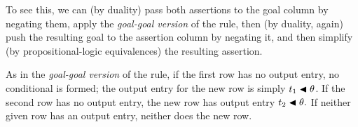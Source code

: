 \documentclass[runningheads]{llncs}
\DeclareMathOperator{\uor}{\emph{or}\,}
\DeclareMathOperator{\unot}{\emph{not}\kern-.0pt}
\begin{document}
\noindent To see this, we can (by duality) pass both assertions to the goal column by negating them, apply the \emph{goal-goal version} of the rule, then (by duality, again) push the resulting goal to the assertion column by negating it, and then simplify (by propositional-logic equivalences) the resulting assertion.

As in the \emph{goal-goal version} of the rule, if the first row has no output entry, no conditional is formed; the output entry for the new row is simply ${{t}_{1} \blacktriangleleft \theta}$.  If the second row has no output entry, the new row has output entry  ${{t}_{2} \blacktriangleleft \theta}.$  If neither given row has an output entry, neither does the new row.



\begin{comment}
    \begin{center}
\begin{tabular} {T}
\hline
    \begin{center}$\uor(\unot(\expsub{\mathcal{P}}{1}),\expsub{\mathcal{R}}{1})$\end{center} & $\qquad$ & \begin{center}$\expsub{t}{1}$\end{center} \\
    \begin{center}$\uor(\unot(\expsub{\mathcal{P}}{1}),\expsub{\mathcal{R}}{1})$ \end{center}& $\qquad$ & \begin{center}$\expsub{t}{1}$\end{center} \\
  \hline
\end{tabular}
\end{center}
\noindent and
  \begin{center}
\begin{tabular} {T}
\hline
    \begin{center}$ \uor(\expsub{\mathcal{P}}{2},\expsub{\mathcal{R}}{2})$\end{center}  &  $\qquad$  & \begin{center}$\expsub{t}{2}$\end{center} \\
  \hline
\end{tabular}
\end{center}
\noindent where the two rows are standardized apart, and $\expsub{\mathcal{P}}{1}$ and $\expsub{\mathcal{P}}{2}$ are unifiable, with the most-general unifier $\theta$; let  $ \mathcal{P} = \expsub{\mathcal{P}}{1} \apply \theta = \expsub{\mathcal{P}}{2} \apply \theta$.  Then, we can infer the new goal row
\end{comment}
 
\end{document}
